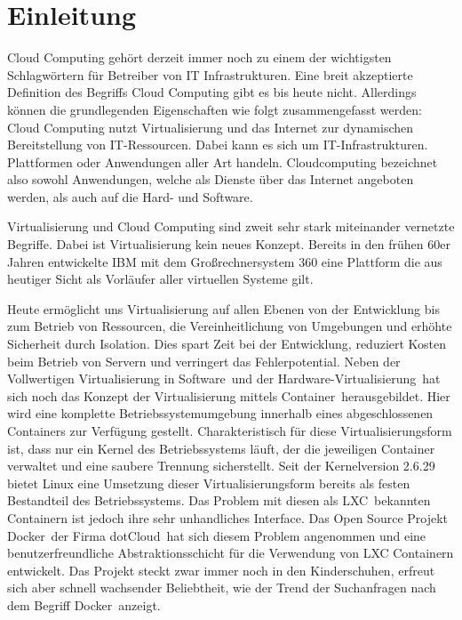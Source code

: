 \chapter{Einleitung}
\label{sec:einleitung}

Cloud Computing gehört derzeit immer noch zu einem der wichtigsten Schlagwörtern für Betreiber von IT Infrastrukturen.
\glqq Eine breit akzeptierte Definition des Begriffs Cloud Computing gibt es bis heute nicht. Allerdings können die grundlegenden Eigenschaften wie folgt zusammengefasst werden: Cloud Computing nutzt Virtualisierung und das Internet zur dynamischen Bereitstellung von IT-Ressourcen. Dabei kann es sich um IT-Infrastrukturen. Plattformen oder Anwendungen aller Art handeln. Cloudcomputing bezeichnet also sowohl Anwendungen, welche als Dienste über das Internet angeboten werden, als auch auf die Hard- und Software.\grqq \cite[S. 28]{meinel_virtualisierung_2011}

Virtualisierung und Cloud Computing sind zweit sehr stark miteinander vernetzte Begriffe.
Dabei ist Virtualisierung kein neues Konzept. Bereits in den frühen 60er Jahren entwickelte IBM mit dem Großrechnersystem 360 eine Plattform die aus heutiger Sicht als Vorläufer aller virtuellen Systeme gilt. \cite{frank_balmes_grin_????}

Heute ermöglicht uns Virtualisierung auf \glqq allen Ebenen von der Entwicklung bis zum Betrieb von Ressourcen, die Vereinheitlichung von Umgebungen und erhöhte Sicherheit durch Isolation. Dies spart Zeit bei der Entwicklung, reduziert Kosten beim Betrieb von Servern und verringert das Fehlerpotential.\grqq \cite[S. 1]{schroder_container-virtualisierung_2014}
Neben der Vollwertigen \grq Virtualisierung in Software\grq\ und der \grq Hardware-Virtualisierung\grq\ hat sich noch das Konzept der \grq Virtualisierung mittels Container\grq\ herausgebildet.
\glqq Hier wird eine komplette Betriebssystemumgebung innerhalb eines abgeschlossenen Containers zur Verfügung gestellt. Charakteristisch für diese Virtualisierungsform ist, dass nur ein Kernel des Betriebssystems läuft, der die jeweiligen Container verwaltet und eine saubere Trennung sicherstellt.\grqq \cite{plotner_linux_2012}
Seit der Kernelversion 2.6.29 \cite{fischer_linux_2014} bietet Linux eine Umsetzung dieser Virtualisierungsform bereits als festen Bestandteil des Betriebssystems.
Das Problem mit diesen als \grq LXC\grq\ bekannten Containern ist jedoch ihre sehr unhandliches Interface.
Das Open Source Projekt \grq Docker\grq\ der Firma \grq dotCloud\grq\ hat sich diesem Problem angenommen und eine benutzerfreundliche Abstraktionsschicht für die Verwendung von LXC Containern entwickelt. Das Projekt steckt zwar immer noch in den Kinderschuhen, erfreut sich aber schnell wachsender Beliebtheit, wie der Trend der Suchanfragen nach dem Begriff \grq Docker\grq\ anzeigt.

